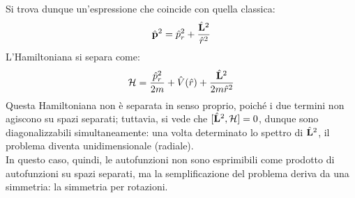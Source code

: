 Si trova dunque un'espressione che coincide con quella classica:
\begin{equation}
	\hat{\mathbf{p}}^2 = \hat{p}^2_r + \frac{\hat{\mathbf{L}}^2}{\hat{r}^2}
	\label{eq:1.36}
\end{equation}
L'Hamiltoniana si separa come:
\begin{equation}
	\mathcal{H} = \frac{\hat{p}_r^2}{2m} + \hat{V}(\hat{r}) + \frac{\hat{\mathbf{L}}^2}{2m\hat{r}^2}
	\label{eq:1.37}
\end{equation}
Questa Hamiltoniana non è separata in senso proprio, poiché i due termini non agiscono su spazi separati; tuttavia, si vede che $ [\hat{\mathbf{L}}^2,\mathcal{H}] = 0 $, dunque sono diagonalizzabili simultaneamente: una volta determinato lo spettro di $ \hat{\mathbf{L}}^2 $, il problema diventa unidimensionale (radiale).\\
In questo caso, quindi, le autofunzioni non sono esprimibili come prodotto di autofunzioni su spazi separati, ma la semplificazione del problema deriva da una simmetria: la simmetria per rotazioni.










